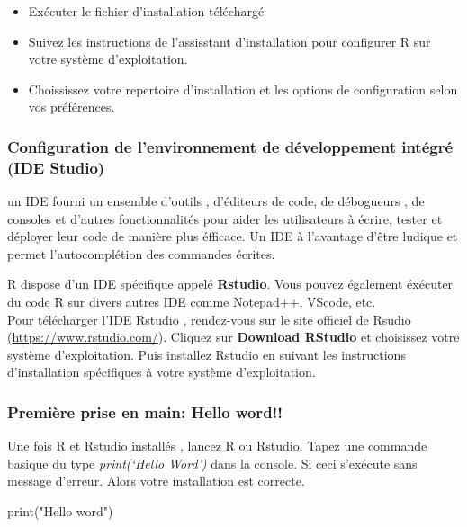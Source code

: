 \documentclass[
]{article}
\newenvironment{Shaded}{\begin{snugshade}}{\end{snugshade}}
\newcommand{\FunctionTok}[1]{\textcolor[rgb]{0.00,0.00,0.00}{#1}}
\newcommand{\NormalTok}[1]{#1}
\newcommand{\StringTok}[1]{\textcolor[rgb]{0.31,0.60,0.02}{#1}}
\providecommand{\tightlist}{%
  \setlength{\itemsep}{0pt}\setlength{\parskip}{0pt}}
\begin{document}
\begin{itemize}
\tightlist
\item
  Exécuter le fichier d'installation téléchargé\\
\item
  Suivez les instructions de l'assisstant d'installation pour configurer
  R sur votre système d'exploitation.\\
\item
  Choississez votre repertoire d'installation et les options de
  configuration selon vos préférences.
\end{itemize}

\hypertarget{configuration-de-lenvironnement-de-duxe9veloppement-intuxe9gruxe9-ide-studio}{%
\subsubsection{Configuration de l'environnement de développement intégré
(IDE
Studio)}\label{configuration-de-lenvironnement-de-duxe9veloppement-intuxe9gruxe9-ide-studio}}

un IDE fourni un ensemble d'outils , d'éditeurs de code, de débogueurs ,
de consoles et d'autres fonctionnalités pour aider les utilisateurs à
écrire, tester et déployer leur code de manière plus éfficace. Un IDE à
l'avantage d'être ludique et permet l'autocomplétion des commandes
écrites.

R dispose d'un IDE spécifique appelé \textbf{Rstudio}. Vous pouvez
également éxécuter du code R sur divers autres IDE comme Notepad++,
VScode, etc.\\
Pour télécharger l'IDE Rstudio , rendez-vous sur le site officiel de
Rsudio (\url{https://www.rstudio.com/}). Cliquez sur \textbf{Download
RStudio} et choisissez votre système d'exploitation. Puis installez
Rstudio en suivant les instructions d'installation spécifiques à votre
système d'exploitation.

\hypertarget{premiuxe8re-prise-en-main-hello-word}{%
\subsubsection{Première prise en main: Hello
word!!}\label{premiuxe8re-prise-en-main-hello-word}}

Une fois R et Rstudio installés , lancez R ou Rstudio. Tapez une
commande basique du type \emph{print(`Hello Word')} dans la console. Si
ceci s'exécute sans message d'erreur. Alors votre installation est
correcte.

\begin{Shaded}
\begin{Highlighting}[]
\FunctionTok{print}\NormalTok{(}\StringTok{"Hello word"}\NormalTok{)}
\end{Highlighting}
\end{Shaded}
\end{document}
